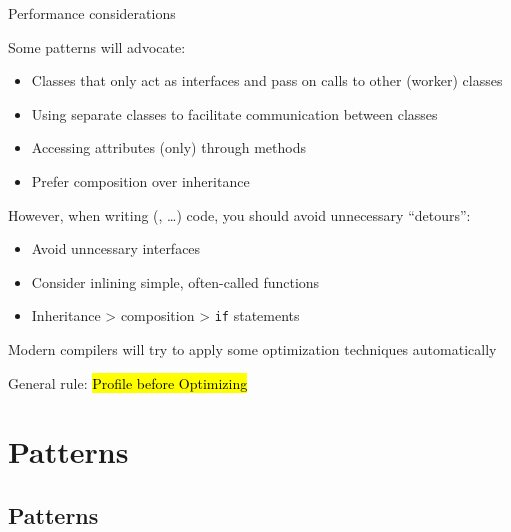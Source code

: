\begin{frame}{Performance considerations}

	Some patterns will advocate:
	\begin{itemize}
		\item Classes that only act as interfaces and pass on calls to other (worker) classes
		\item Using separate classes to facilitate communication between classes
		\item Accessing attributes (only) through methods
		\item Prefer composition over inheritance
	\end{itemize}

	\bigskip
	However, when writing  (, \dots) code, you should avoid unnecessary \enquote{detours}:

	\begin{itemize}
		\item Avoid unncessary interfaces
		\item Consider inlining simple, often-called functions 
		\item Inheritance > composition > \texttt{if} statements
	\end{itemize}
	Modern compilers will try to apply some optimization techniques automatically 

	\bigskip
	General rule: \hl{Profile before Optimizing}
\end{frame}

\section{Patterns}


\subsection{Patterns}

